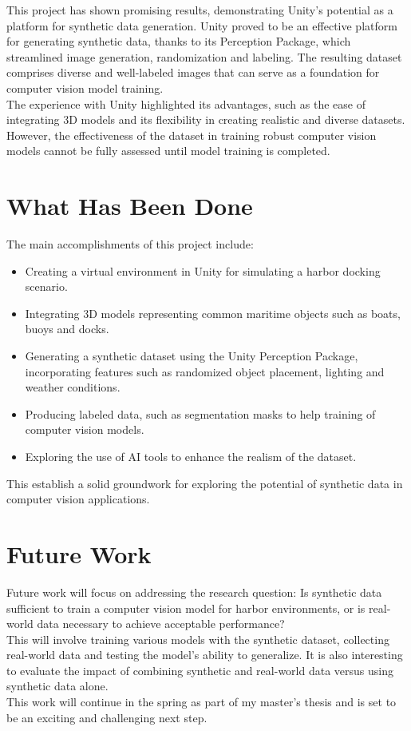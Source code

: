 
This project has shown promising results, demonstrating Unity's potential as a platform for synthetic data generation. Unity proved to be an effective platform for generating synthetic data, thanks to its Perception Package, which streamlined image generation, randomization and labeling. The resulting dataset comprises diverse and well-labeled images that can serve as a foundation for computer vision model training.\\

\noindent The experience with Unity highlighted its advantages, such as the ease of integrating 3D models and its flexibility in creating realistic and diverse datasets. However, the effectiveness of the dataset in training robust computer vision models cannot be fully assessed until model training is completed.


\section{What Has Been Done}
The main accomplishments of this project include: 
\begin{itemize} 
\item Creating a virtual environment in Unity for simulating a harbor docking scenario. 
\item Integrating 3D models representing common maritime objects such as boats, buoys and docks. 
\item Generating a synthetic dataset using the Unity Perception Package, incorporating features such as randomized object placement, lighting and weather conditions. 
\item Producing labeled data, such as segmentation masks to help training of computer vision models. 
\item Exploring the use of AI tools to enhance the realism of the dataset. 
\end{itemize}
  
\noindent This establish a solid groundwork for exploring the potential of synthetic data in computer vision applications.

\section{Future Work}
Future work will focus on addressing the research question: Is synthetic data sufficient to train a computer vision model for harbor environments, or is real-world data necessary to achieve acceptable performance?\\

\noindent This will involve training various models with the synthetic dataset, collecting real-world data and testing the model's ability to generalize. It is also interesting to evaluate the impact of combining synthetic and real-world data versus using synthetic data alone.\\

\noindent This work will continue in the spring as part of my master's thesis and is set to be an exciting and challenging next step.

